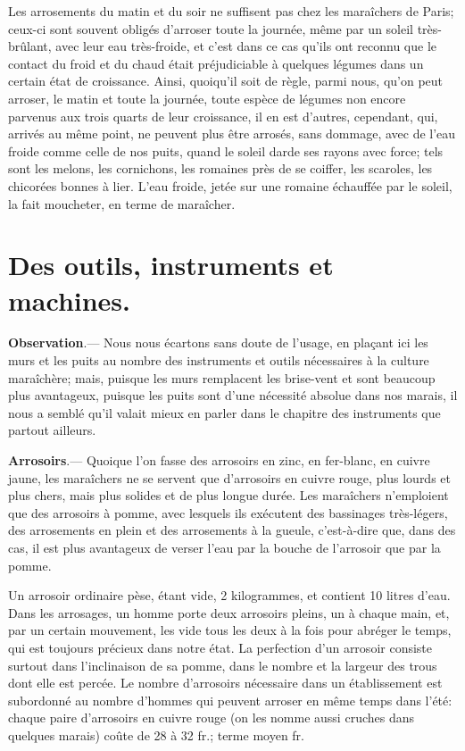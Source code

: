 \documentclass[10pt,a4paper]{book}
\begin{document}
Les arrosements du matin et du soir ne suffisent pas chez les maraîchers de Paris; ceux-ci sont souvent obligés d'arroser toute la journée, même par un soleil très-brûlant, avec leur eau très-froide, et c'est dans ce cas qu'ils ont reconnu que le contact du froid et du chaud était préjudiciable à quelques légumes dans un certain état de croissance. Ainsi, quoiqu'il soit de règle, parmi nous, qu'on peut arroser, le matin et toute la journée, toute espèce de légumes non encore parvenus aux trois quarts de leur croissance, il en est d'autres, cependant, qui, arrivés au même point, ne peuvent plus être arrosés, sans dommage, avec de l'eau froide comme celle de nos puits, quand le soleil darde ses rayons avec force; tels sont les melons, les cornichons, les romaines près de se coiffer, les scaroles, les chicorées bonnes à lier. L'eau froide, jetée sur une romaine échauffée par le soleil, la fait moucheter, en terme de maraîcher.

\chapter{Des outils, instruments et machines.}\label{outils}

{\small \textbf{Observation}.--- Nous nous écartons sans doute de l'usage, en plaçant ici les murs et les puits au nombre des instruments et outils nécessaires à la culture maraîchère; mais, puisque les murs remplacent les brise-vent et sont beaucoup plus avantageux, puisque les puits sont d'une nécessité absolue dans nos marais, il nous a semblé qu'il valait mieux en parler dans le chapitre des instruments que partout ailleurs.}

\textbf{Arrosoirs}.--- Quoique l'on fasse des arrosoirs en zinc, en fer-blanc, en cuivre jaune, les maraîchers ne se servent que d'arrosoirs en cuivre rouge, plus lourds et plus chers, mais plus solides et de plus longue durée. Les maraîchers n'emploient que des arrosoirs à pomme, avec lesquels ils exécutent des bassinages très-légers, des arrosements en plein et des arrosements à la gueule, c'est-à-dire que, dans des cas, il est plus avantageux de verser l'eau par la bouche de l'arrosoir que par la pomme.

Un arrosoir ordinaire pèse, étant vide, 2 kilogrammes, et contient 10 litres d'eau. Dans les arrosages, un homme porte deux arrosoirs pleins, un à chaque main, et, par un certain mouvement, les vide tous les deux à la fois pour abréger le temps, qui est toujours précieux dans notre état. La perfection d'un arrosoir consiste surtout dans l'inclinaison de sa pomme, dans le nombre et la largeur des trous dont elle est percée. Le nombre d'arrosoirs nécessaire dans un établissement est subordonné au nombre d'hommes qui peuvent arroser en même temps dans l'été: chaque paire d'arrosoirs en cuivre rouge (on les nomme aussi cruches dans quelques marais) coûte de 28 à 32 fr.; terme moyen  fr.
\end{document}
